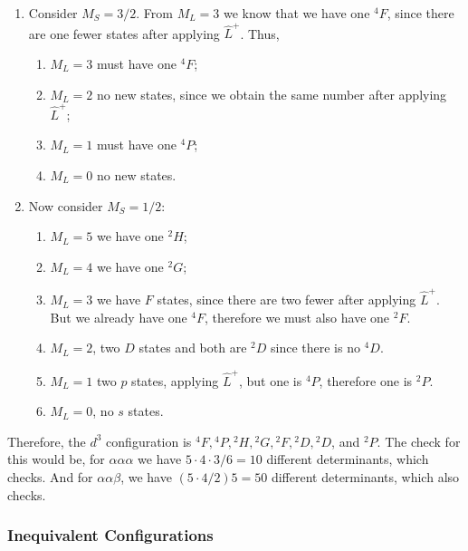 \begin{enumerate}
\item Consider $M_S = 3/2$.  From $M_L = 3$ we know that we have 
one ${^4F}$, since there are one fewer states after applying ${\hat 
L}^+$.  Thus, 
\begin{enumerate}
\item $M_L = 3$ must have one ${^4F}$;  
\item $M_L = 2$ no new states, since we obtain the same number after
  applying ${\hat L}^+$;  
\item $M_L = 1$ must have one ${^4P}$;
\item $M_L = 0$ no new states.
\end{enumerate}

\item Now consider $M_S = 1/2$: 
\begin{enumerate}
\item $M_L = 5$ we have one ${^2H}$;  
\item $M_L = 4$ we have one ${^2G}$;  
\item $M_L = 3$ we have $F$ states, 
since there are two fewer after applying ${\hat L}^+$. But we already 
have one ${^4F}$, therefore we must also have one ${^2F}$. 
\item $M_L = 2$, two $D$ states and both are ${^2D}$ since there is no 
${^4D}$.  
\item $M_L = 1$ two $p$ states, applying ${\hat L}^+$, but 
one is ${^4P}$, therefore one is ${^2P}$.  
\item $M_L = 0$, no $s$ states.
\end{enumerate}
\end{enumerate}
Therefore, the $d^3$ configuration is ${^4F} , {^4P} , {^2H}, {^2G} ,
{^2F}, {^2D}, {^2D}$, and ${^2P}$.  The check for this would be, for
$\alpha \alpha \alpha$ we have $5 \cdot 4 \cdot 3/6 = 10$ different
determinants, which checks.  And for $\alpha \alpha \beta$, we have $(5
\cdot 4/2)5 = 50$ different determinants, which also checks.

\subsubsection{Inequivalent Configurations}

